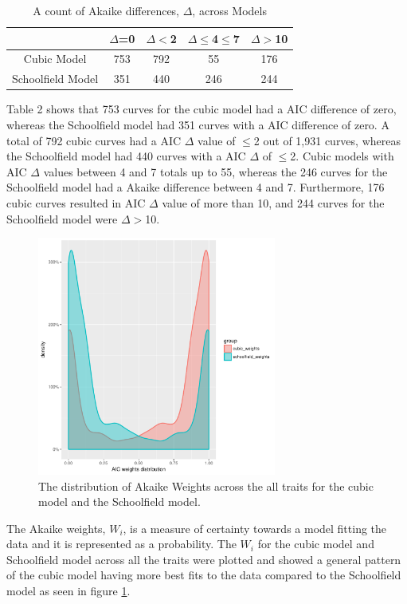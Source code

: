 {\begin{table}[H]
\centering
\caption{A count of Akaike differences, $\Delta$, across Models}
\label{my-label}
\begin{tabular}{|c|c|c|c|c|}
\hline
 & {$\Delta$=0} &{$\Delta$$<$2}  & {$\Delta$$\leq$4$\leq$7} &  {$\Delta$$>$10} \\ \hline
Cubic Model & 753 & 792  & 55 & 176 \\ \hline
Schoolfield Model & 351 & 440 & 246 & 244 \\ \hline
\end{tabular}
\end{table}

Table 2 shows that 753 curves for the cubic model had a AIC difference of zero, whereas the Schoolfield model had 351 curves with a AIC difference of zero. A total of 792 cubic curves had a AIC $\Delta$ value of $\leq$2 out of 1,931 curves, whereas the Schoolfield model had 440 curves with a AIC $\Delta$ of $\leq$2. Cubic models with AIC $\Delta$ values between 4 and 7 totals up to 55, whereas the 246 curves for the Schoolfield model had a Akaike difference between 4 and 7. Furthermore, 176 cubic curves resulted in AIC $\Delta$ value of more than 10, and 244 curves for the Schoolfield model were $\Delta$$>$10. 

\begin{figure}[H]
	\centering
	\includegraphics[width=0.7\textwidth]{../Results/general_plot.pdf}
	\caption{\label{fig:Akaike Weights}The distribution of Akaike Weights across the all traits for the cubic model and the Schoolfield model.}
\end{figure}

The Akaike weights, $W_i$, is a measure of certainty towards a model fitting the data and it is represented as a probability. The $W_i$ for the cubic model and Schoolfield model across all the traits were plotted and showed a general pattern of the cubic model having more best fits to the data compared to the Schoolfield model as seen in figure \ref{fig:Akaike Weights}. 

}
